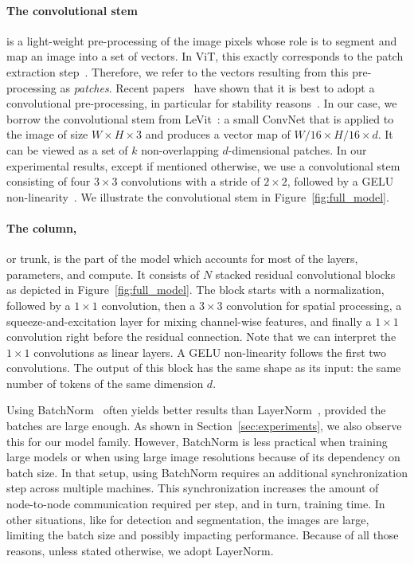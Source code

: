 \paragraph{The convolutional stem} is a light-weight pre-processing of the image pixels whose role is to segment and map an image into a set of vectors. 
In ViT, this exactly corresponds to the patch extraction step~\cite{dosovitskiy2020image}.
Therefore, we refer to the vectors resulting from this pre-processing as \emph{patches}. 
Recent papers~\cite{graham2021levit,el2021xcit} have shown that it is best to adopt a convolutional pre-processing, in particular for stability reasons~\cite{xiao2021early}. 
In our case, we borrow the convolutional stem from LeVit~\cite{graham2021levit}: a small ConvNet that is applied to the image of size $W\times H \times 3$ and produces a vector map of $W/16 \times H/16 \times d$. 
It can be viewed as a set of $k$ non-overlapping $d$-dimensional patches. 
%
In our experimental results, except if mentioned otherwise, we use a convolutional stem consisting of four $3\times3$ convolutions with a stride of $2\times2$, followed by a GELU non-linearity~\cite{Hendrycks2016GaussianEL}.
We illustrate the convolutional stem in Figure~\ref{fig:full_model}.

\paragraph{The column,} or trunk, is the part of the model which accounts for most of the layers, parameters, and compute. 
It consists of $N$ stacked residual convolutional blocks as depicted in Figure~\ref{fig:full_model}. 
The block starts with a normalization, followed by a $1\times1$ convolution, then a $3 \times 3$ convolution for spatial processing, a squeeze-and-excitation layer \cite{Hu2017SENet} for mixing channel-wise features, and finally a $1\times1$ convolution right before the residual connection. 
Note that we can interpret the $1\times1$ convolutions as linear layers.
A GELU non-linearity follows the first two convolutions. 
The output of this block has the same shape as its input: the same number of tokens of the same dimension $d$.

Using BatchNorm~\cite{ioffe15batchnorm} often yields better results than LayerNorm~\cite{ba2016layer}, provided the batches are large enough. 
As shown in Section~\ref{sec:experiments}, we also observe this for our model family. 
However, BatchNorm is less practical when training large models or when using large image resolutions because of its dependency on batch size.
In that setup, using BatchNorm requires an additional synchronization step across multiple machines. 
This synchronization increases the amount of node-to-node communication required per step, and in turn, training time. 
In other situations, like for detection and segmentation, the images are large, limiting the batch size and possibly impacting performance. 
Because of all those reasons, unless stated otherwise, we adopt LayerNorm.

